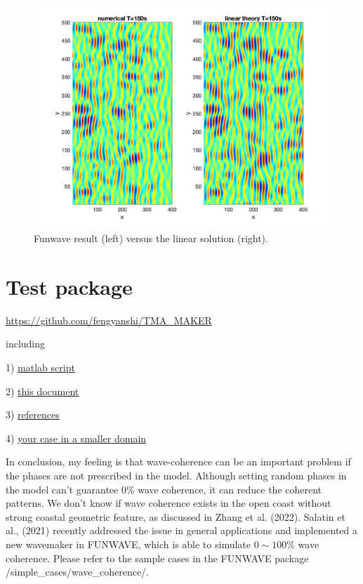 \documentclass[preprint,10pt]{elsarticle}
\begin{document}
 \begin{figure}
\begin{center}
 \includegraphics[width=1.0\textwidth]{figures/theory_funwave_150.jpg}
 \caption{Funwave result (left) versus the linear solution (right).}
 \label{funwave_theory}
 \end{center}
 \end{figure}

 \section{Test package}
 
 \href{https://github.com/fengyanshi/TMA_MAKER}{https://github.com/fengyanshi/TMA\_MAKER}
 
 including
 
 1)  \href{https://github.com/fengyanshi/TMA_MAKER/tree/master/LInear_Program}{matlab script}
  
 2)  \href{https://github.com/fengyanshi/TMA_MAKER/tree/master/DOC}{this document}
 
 3)  \href{https://github.com/fengyanshi/TMA_MAKER/tree/master/references}{references}
 
 4)  \href{https://github.com/fengyanshi/TMA_MAKER/tree/master/TEST_CASE}{your case in a smaller domain}

\vspace{1cm}
 
 In conclusion, my feeling is that wave-coherence can be an important problem if the phases are not prescribed in the model. Although setting random phases in the model can't guarantee 0\% wave coherence, it can reduce the coherent patterns. We don't know if wave coherence exists in the open coast without strong coastal geometric feature, as discussed in Zhang et al. (2022).   Salatin et al., (2021) recently addressed the issue in general applications and implemented a new wavemaker in FUNWAVE, which is able to simulate $0 \sim 100\%$ wave coherence. Please refer to the sample cases in the FUNWAVE package /simple\_cases/wave\_coherence/. 
  
  
  
  
\end{document}
